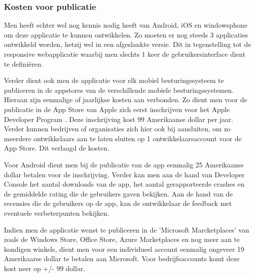 \subsubsection{Kosten voor publicatie}
Men heeft echter wel nog kennis nodig heeft van Android, iOS en windowsphone om deze applicatie te
kunnen ontwikkelen. Zo moeten er nog steeds 3 applicaties ontwikkeld worden, hetzij wel in een afgeslankte versie.
Dit in tegenstelling tot de responsive webapplicatie waarbij men slechts 1 keer de gebruikersinterface dient te definiëren.

Verder dient ook men de applicatie voor elk mobiel besturingssysteem te publiceren in de appstores van de verschillende
mobiele besturingssystemen. Hieraan zijn  eenmalige of jaarlijkse kosten aan verbonden. Zo dient men voor de publicatie in de App Store van Apple zich eerst inschrijven voor het
Apple Developer Program \citep{appledeveloperprograms2017} . Deze inschrijving kost 99 Amerikaanse dollar per jaar. Verder kunnen bedrijven of organisaties
zich hier ook bij aansluiten, om zo meerdere ontwikkelaars aan te laten sluiten op 1 ontwikkelaarsaccount voor de App Store.
Dit verlaagd de kosten.

Voor Android dient men bij de publicatie van de app \citep{getstartedwithpublishingandroiddevelopers2017} eenmalig 25 Amerikaanse dollar betalen voor de inschrijving.
Verder kan men aan de hand van Developer Console het aantal downloads van de app, het aantal gerapporteerde crashes en de gemiddelde rating die de gebruikers gaven bekijken.
Aan de hand van de recensies die de gebruikers op de app, kan de ontwikkelaar de feedback met eventuele verbeterpunten bekijken.

Indien men de applicatie wenst te publiceren in de 'Microsoft Marcketplaces' van \cite{registerasanappdeveloper2017}
 zoals de Windows Store, Office Store, Azure Marketplaces en nog meer aan te kondigen winkels, dient men voor een individueel account
 eenmalig ongeveer 19 Amerikaarse dollar te betalen aan Microsoft. Voor bedrijfsaccounts komt deze kost neer op +/- 99 dollar.
